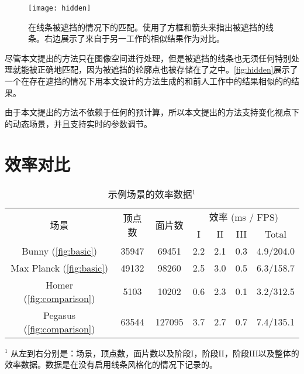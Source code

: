 \begin{figure}[tbh]
    \centering
    \texttt{[image: hidden]}
    \caption[遮挡情况下的匹配]{\label{fig:hidden}
    在线条被遮挡的情况下的匹配。使用了方框和箭头来指出被遮挡的线条。右边展示了来自于另一工作\cite{bukenberger2018stereo}的相似结果作为对比。}
\end{figure}

尽管本文提出的方法只在图像空间进行处理，但是被遮挡的线条也无须任何特别处理就能被正确地匹配，因为被遮挡的轮廓点也被存储在了\ppll{}之中。\autoref{fig:hidden}展示了一个在存在遮挡的情况下用本文设计的方法生成的和前人工作中的结果相似的的结果。

由于本文提出的方法不依赖于任何的预计算，所以本文提出的方法支持变化视点下的动态场景，并且支持实时的参数调节。

\section{效率对比}

\begin{table}[tbh]
    \renewcommand{\arraystretch}{1.3}
    \centering
  \begin{threeparttable}
    \caption[示例场景的效率数据]{示例场景的效率数据$^1$}
    \label{tab:performance}
    \centering
    \begin{tabular}{c|cc|ccc|c}
    \hline
    \multirow{2}{*}{场景} & \multirow{2}{*}{顶点数} & \multirow{2}{*}{面片数} & \multicolumn{4}{c}{效率 (ms / FPS)} \\
    \cline{4-7}
    & & & I & II & III & Total \\
    \hline
    Bunny (\autoref{fig:basic}) & 35947 & 69451 & {2.2} & {2.1} & {0.3} & {4.9/204.0} \\
    Max Planck (\autoref{fig:basic}) & 49132 & 98260 & {2.5} & {3.0} & {0.5} & {6.3/158.7} \\
    Homer (\autoref{fig:comparison}) & 5103 & 10202 & {0.6} & {2.3} & {0.1} & {3.2/312.5} \\
    Pegasus (\autoref{fig:comparison}) & 63544 & 127095 & {3.7} & {2.7} & {0.7} & {7.4/135.1} \\
    \hline
    \end{tabular}
    \begin{tablenotes}
      \item $^1$ 从左到右分别是：场景，顶点数，面片数以及阶段I，阶段II，阶段III以及整体的效率数据。数据是在没有启用线条风格化的情况下记录的。
    \end{tablenotes}
  \end{threeparttable}
\end{table}


